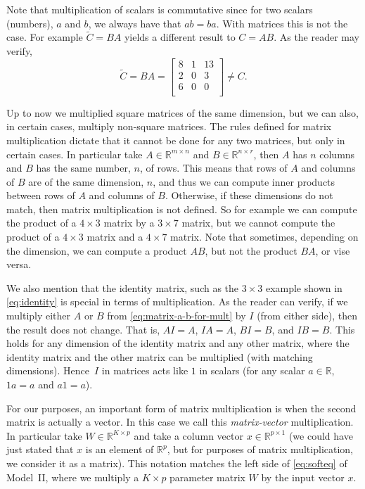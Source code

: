 \documentclass[12pt]{article}
\begin{document}
Note that multiplication of scalars is commutative since for two scalars (numbers), $a$ and $b$, we always have that $ab = ba$. With matrices this is not the case. For example $\tilde{C}=BA$ yields a different result to $C= AB$. As the reader may verify,
%
\begin{equation}
\label{eq:matrix-example-2}
\tilde{C} = BA = 
\begin{bmatrix}
8 & 1 & 13 \\
2 & 0 & 3 \\
6 & 0 & 0 \\
\end{bmatrix}
\neq C.
\end{equation}
%

Up to now we multiplied square matrices of the same dimension, but we can also, in certain cases, multiply non-square matrices. The rules defined for matrix multiplication dictate that it cannot be done for any two matrices, but only in certain cases. In particular take $A \in {\mathbb R}^{m \times n}$ and $B \in {\mathbb R}^{n \times r}$, then $A$ has $n$ columns and $B$ has the same number, $n$, of rows. This means that rows of $A$ and columns of $B$ are of the same dimension, $n$, and thus we can compute inner products between rows of $A$ and columns of $B$. Otherwise, if these dimensions do not match, then matrix multiplication is not defined. So for example we can compute the product of a $4 \times 3$ matrix by a $3 \times 7$ matrix, but we cannot compute the product of a $4 \times 3$ matrix and a $4 \times 7$ matrix. Note that sometimes, depending on the dimension, we can compute a product $AB$, but not the product $BA$, or vise versa.

We also mention that the identity matrix, such as the $3 \times 3$ example shown in \eqref{eq:identity} is special in terms of multiplication. As the reader can verify, if we multiply either $A$ or $B$ from \eqref{eq:matrix-a-b-for-mult} by $I$ (from either side), then the result does not change. That is, $AI = A$, $IA = A$, $BI = B$, and $IB = B$. This holds for any dimension of the identity matrix and any other matrix, where the identity matrix and the other matrix can be multiplied (with matching dimensions). Hence~$I$ in matrices acts like $1$ in scalars (for any scalar $a \in {\mathbb R}$, $1a = a$ and $a1 = a$).

For our purposes, an important form of matrix multiplication is when the second matrix is actually a vector. In this case we call this {\em matrix-vector} multiplication. In particular take $W \in {\mathbb R}^{K \times p}$ and take a column vector $x \in {\mathbb R}^{p \times 1}$ (we could have just stated that $x$ is an element of ${\mathbb R}^p$, but for purposes of matrix multiplication, we consider it as a matrix). This notation matches the left side of \eqref{eq:softeq} of Model~II, where we multiply a $K \times p$ parameter matrix $W$ by the input vector $x$. 
\end{document}
